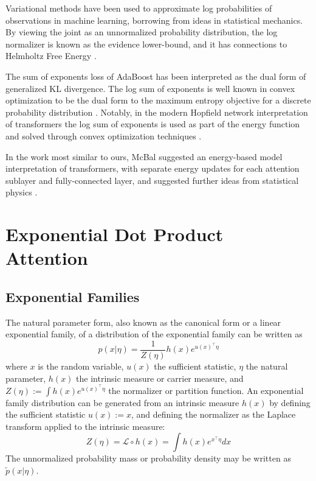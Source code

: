 \documentclass{article}
\begin{document}
Variational methods have been used to approximate log probabilities of observations in machine learning, borrowing from ideas in statistical mechanics. By viewing the joint as an unnormalized probability distribution, the log normalizer is known as the evidence lower-bound, and it has connections to Helmholtz Free Energy \cite{Hinton:1995,koller2009probabilistic}.

The sum of exponents loss of AdaBoost \cite{collins00logistic} has been interpreted as the dual form of generalized KL divergence. The log sum of exponents is well known in convex optimization to be the dual form to the maximum entropy objective for a discrete probability distribution \cite{citeulike:163662}. Notably, in the modern Hopfield network interpretation of transformers the log sum of exponents is used as part of the energy function and solved through convex optimization techniques \cite{DBLP:journals/corr/abs-2008-02217}.

In the work most similar to ours, McBal suggested an energy-based model interpretation of transformers, with separate energy updates for each attention sublayer and fully-connected layer, and suggested further ideas from statistical physics \cite{bal_2020}.

\section{Exponential Dot Product Attention}
\label{exponential dot product attention}

\subsection{Exponential Families}
\label{exponential families}
The natural parameter form, also known as the canonical form or a linear exponential family, of a distribution of the exponential family can be written as
\begin{equation}
  p(x \vert \eta) = 
    \frac{1}{Z \left( \eta \right) }
    h(x)
    e^{ u(x)^\intercal \eta}
  \label{exponential family}
\end{equation}
where $x$ is the random variable, 
$u(x)$ the sufficient statistic, 
$\eta$ the natural parameter, 
$h(x)$ the intrinsic measure or carrier measure, 
and 
$Z ( \eta ) := \int h(x) e^{ u(x)^\intercal \eta }$ the normalizer or partition function.
An exponential family distribution can be generated from an intrinsic measure $h(x)$ by defining the sufficient statistic $u(x) := x$, and defining the normalizer as the Laplace transform applied to the intrinsic measure:
\begin{equation}
  Z ( \eta ) = \mathcal{L} \circ h(x) = \int h(x) e^{ x^\intercal \eta} dx
  \label{Laplace transform}
\end{equation}
The unnormalized probability mass or probability density may be written as $\tilde{p}(x \vert \eta)$.
\end{document}
